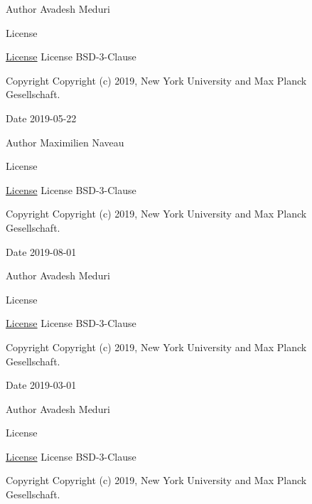 \begin{DoxyAuthor}{Author}
Avadesh Meduri 
\end{DoxyAuthor}
\begin{DoxyRefDesc}{License}
\item[\hyperlink{license__license000011}{License}]License B\+S\+D-\/3-\/\+Clause \end{DoxyRefDesc}
\begin{DoxyCopyright}{Copyright}
Copyright (c) 2019, New York University and Max Planck Gesellschaft. 
\end{DoxyCopyright}
\begin{DoxyDate}{Date}
2019-\/05-\/22
\end{DoxyDate}
\begin{DoxyAuthor}{Author}
Maximilien Naveau 
\end{DoxyAuthor}
\begin{DoxyRefDesc}{License}
\item[\hyperlink{license__license000012}{License}]License B\+S\+D-\/3-\/\+Clause \end{DoxyRefDesc}
\begin{DoxyCopyright}{Copyright}
Copyright (c) 2019, New York University and Max Planck Gesellschaft. 
\end{DoxyCopyright}
\begin{DoxyDate}{Date}
2019-\/08-\/01
\end{DoxyDate}
\begin{DoxyAuthor}{Author}
Avadesh Meduri 
\end{DoxyAuthor}
\begin{DoxyRefDesc}{License}
\item[\hyperlink{license__license000016}{License}]License B\+S\+D-\/3-\/\+Clause \end{DoxyRefDesc}
\begin{DoxyCopyright}{Copyright}
Copyright (c) 2019, New York University and Max Planck Gesellschaft. 
\end{DoxyCopyright}
\begin{DoxyDate}{Date}
2019-\/03-\/01
\end{DoxyDate}
\begin{DoxyAuthor}{Author}
Avadesh Meduri 
\end{DoxyAuthor}
\begin{DoxyRefDesc}{License}
\item[\hyperlink{license__license000019}{License}]License B\+S\+D-\/3-\/\+Clause \end{DoxyRefDesc}
\begin{DoxyCopyright}{Copyright}
Copyright (c) 2019, New York University and Max Planck Gesellschaft. 
\end{DoxyCopyright}
